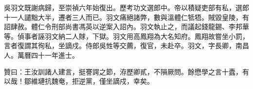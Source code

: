 \begin{pinyinscope}
吳羽文既謝病歸，至崇禎六年始復出。歷考功文選郎中。帝以積疑吏部有私，選郎十一人譴黜大半，遷者三人而已。羽文痛絕諸弊，數與溫體仁牴牾。賊毀皇陵，有詔肆赦。體仁令刑部尚書馮英以逆案入詔內。羽文執止之，而議起錢龍錫、李邦華等。偵事者誣羽文納二人賕，下獄。羽文用高鳳翔為大名知府。鳳翔故嘗坐小罰，言者復謂其徇私，坐謫戍。侍郎吳甡等交薦，復官，未赴卒。羽文，字長卿，南昌人。萬曆四十一年進士。

贊曰：王汝訓諸人建言，挺謇諤之節，洊歷卿貳，不隕厥問。餘懋學之言十蠹，有以哉！鄒維璉抗魏奄，拒逆黨，僅坐謫戍，幸矣。


\end{pinyinscope}